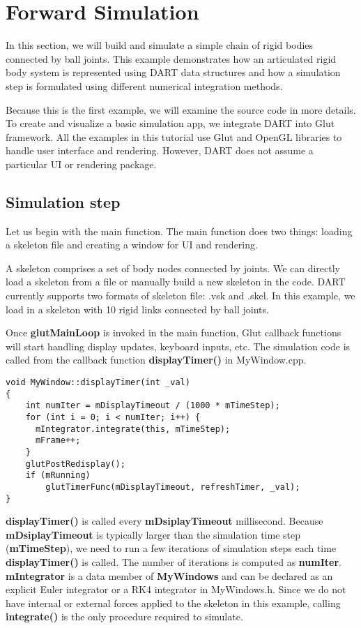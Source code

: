 \section{Forward Simulation}
In this section, we will build and simulate a simple chain of rigid
bodies connected by ball joints. This example demonstrates how an
articulated rigid body system is represented using DART data
structures and how a simulation step is formulated using different
numerical integration methods.

Because this is the first example, we will examine the source code in
more details. To create and visualize a basic simulation app, we
integrate DART into Glut framework. All the examples in this tutorial
use Glut and OpenGL libraries to handle user interface and
rendering. However, DART does not assume a particular UI or rendering
package. 


\subsection{Simulation step}
Let us begin with the main function. The main function does two
things: loading a skeleton file and creating a window for UI and
rendering. 

A skeleton comprises a set of body nodes connected by
joints. We can directly load a skeleton from a file or manually build a new
skeleton in the code. DART currently supports two formats of skeleton
file: .vsk and .skel. In this example, we load in a skeleton with 10
rigid links connected by ball joints. 

Once \textbf{glutMainLoop} is invoked in the main function, Glut
callback functions will start handling display updates, keyboard
inputs, etc. The simulation code is called from the callback function
\textbf{displayTimer()} in MyWindow.cpp.

\ttfamily
\begin{lstlisting}[label=displayTimer,caption=displayTimer]
void MyWindow::displayTimer(int _val)
{
    int numIter = mDisplayTimeout / (1000 * mTimeStep);
    for (int i = 0; i < numIter; i++) {
      mIntegrator.integrate(this, mTimeStep);
      mFrame++;
    }
    glutPostRedisplay();
    if (mRunning)	
        glutTimerFunc(mDisplayTimeout, refreshTimer, _val);
}
\end{lstlisting}
\rmfamily
\textbf{displayTimer()} is called every \textbf{mDsiplayTimeout}
millisecond. Because \textbf{mDsiplayTimeout} is typically larger than
the simulation time step (\textbf{mTimeStep}), we need to run a few
iterations of simulation steps each time \textbf{displayTimer()} is
called. The number of iterations is computed as
\textbf{numIter}. \textbf{mIntegrator} is a data member of
\textbf{MyWindows} and can be declared as an explicit Euler integrator
or a RK4 integrator in MyWindows.h. Since we do not have
internal or external forces applied to the skeleton in this example,
calling \textbf{integrate()} is the only procedure required to
simulate.

